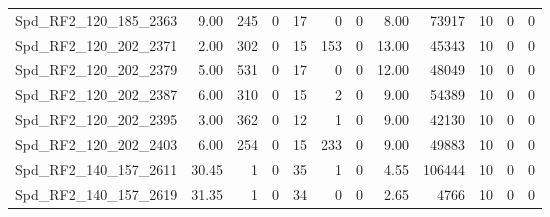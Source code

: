\begin{longtable}[c]{@{}lrrrrrrrrrrr@{}}
Spd\_RF2\_120\_185\_2363     & 9.00                   & 245                     & 0                       & 17                     & 0                       & 0                       & 8.00                    & 73917                    & 10                       & 0                        & 0                        \\
Spd\_RF2\_120\_202\_2371     & 2.00                   & 302                     & 0                       & 15                     & 153                     & 0                       & 13.00                   & 45343                    & 10                       & 0                        & 0                        \\
Spd\_RF2\_120\_202\_2379     & 5.00                   & 531                     & 0                       & 17                     & 0                       & 0                       & 12.00                   & 48049                    & 10                       & 0                        & 0                        \\
Spd\_RF2\_120\_202\_2387     & 6.00                   & 310                     & 0                       & 15                     & 2                       & 0                       & 9.00                    & 54389                    & 10                       & 0                        & 0                        \\
Spd\_RF2\_120\_202\_2395     & 3.00                   & 362                     & 0                       & 12                     & 1                       & 0                       & 9.00                    & 42130                    & 10                       & 0                        & 0                        \\
Spd\_RF2\_120\_202\_2403     & 6.00                   & 254                     & 0                       & 15                     & 233                     & 0                       & 9.00                    & 49883                    & 10                       & 0                        & 0                        \\
Spd\_RF2\_140\_157\_2611     & 30.45                  & 1                       & 0                       & 35                     & 1                       & 0                       & 4.55                    & 106444                   & 10                       & 0                        & 0                        \\
Spd\_RF2\_140\_157\_2619     & 31.35                  & 1                       & 0                       & 34                     & 0                       & 0                       & 2.65                    & 4766                     & 10                       & 0                        & 0                        \\

\end{longtable}
